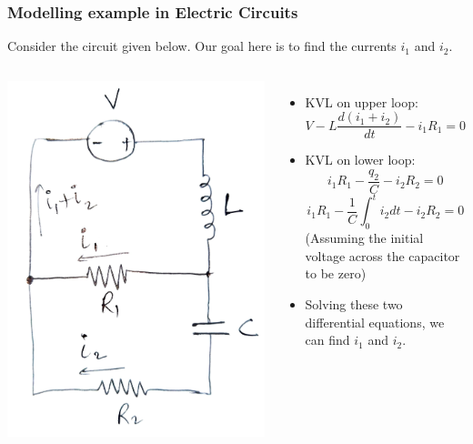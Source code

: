 \documentclass[10pt]{beamer}
\begin{document}
\begin{frame}
    \fontsize{9pt}{10pt}\selectfont
    \frametitle{Modelling example in Electric Circuits}
    Consider the circuit given below. Our goal here is to find the currents $i_1$ and $i_2$.
	\begin{columns}
        \centering
        \includegraphics[height=0.5\textheight,width=\textwidth]{images/current1.jpeg}
        \vfill

        \begin{itemize}
            \item KVL on upper loop:
                $$
                \boxed{V - L \frac{d(i_1 + i_2)}{dt} - i_1 R_1 = 0}
                $$
            \item KVL on lower loop:
                $$
                i_1 R_1 - \frac{q_2}{C} - i_2 R_2 = 0
                $$
                $$
                \boxed{i_1 R_1 - \frac{1}{C} \int_0^ti_2 dt - i_2 R_2 = 0}
                $$
                (Assuming the initial voltage across the capacitor to be zero)
            \item Solving these two differential equations, we can find $i_1$ and $i_2$.
        \end{itemize}

	\end{columns}
\end{frame}
\end{document}
